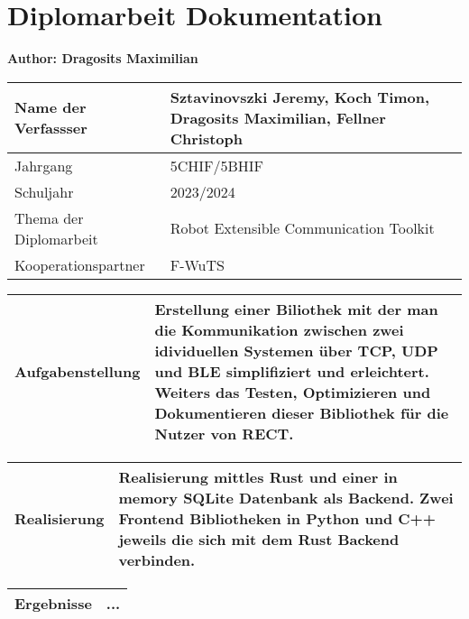 \chapter{Diplomarbeit Dokumentation}
\textbf{Author: Dragosits Maximilian}

\begin{center}
\begin{tabular}{| m{8cm} | m{8cm} |}
    \hline
    Name der Verfassser & Sztavinovszki Jeremy, Koch Timon, Dragosits Maximilian, Fellner Christoph\\
    \hline
    Jahrgang & 5CHIF/5BHIF\\
    Schuljahr & 2023/2024\\
    \hline
    Thema der Diplomarbeit & Robot Extensible Communication Toolkit\\
    \hline
    Kooperationspartner & F-WuTS\\
    \hline
\end{tabular}

\vspace{5mm}

\begin{tabular}{| m{8cm} | m{8cm} |}
    \hline
    Aufgabenstellung & Erstellung einer Biliothek mit der man die Kommunikation zwischen zwei idividuellen Systemen über TCP, UDP und BLE simplifiziert und erleichtert. Weiters das Testen, Optimizieren und Dokumentieren dieser Bibliothek für die Nutzer von RECT.\\ %
    \hline
\end{tabular}

\vspace{5mm}

\begin{tabular}{| m{8cm} | m{8cm} |}
    \hline
    Realisierung & Realisierung mittles Rust und einer in memory SQLite Datenbank als Backend. Zwei Frontend Bibliotheken in Python und C++ jeweils die sich mit dem Rust Backend verbinden.\\ %
    \hline
\end{tabular}

\vspace{5mm}

\begin{tabular}{| m{8cm} | m{8cm} |}
    \hline
    Ergebnisse & ...\\ %
    \hline
\end{tabular}


\end{center}
